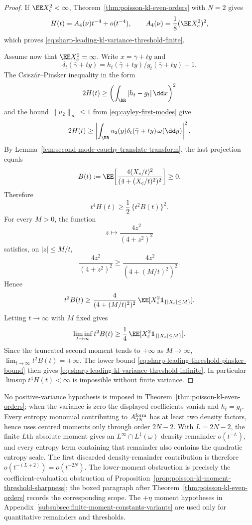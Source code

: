 \begin{proof}
If \(\EE X_c^2<\infty\), Theorem~\ref{thm:poisson-kl-even-orders} with
\(N=2\) gives
\[
H(t)=A_4(\nu)t^{-4}+o(t^{-4}),
\qquad
A_4(\nu)=\frac18(\EE X_c^2)^2,
\]
which proves \eqref{eq:sharp-leading-kl-variance-threshold-finite}.

Assume now that \(\EE X_c^2=\infty\).  Write \(x=\bar{\gamma}+ty\) and
\[
\delta_t(\bar{\gamma}+ty)=h_t(\bar{\gamma}+ty)/g_t(\bar{\gamma}+ty)-1 .
\]
The Csisz{\'a}r--Pinsker inequality
\cite{Pinsker1964,Csiszar1967,BolleyVillani2005} in the form
\[
2H(t)\ge \left(\int_{\RR}|h_t-g_t|\,\dd x\right)^2
\]
and the bound
\(\|u_2\|_\infty\le1\) from \eqref{eq:cayley-first-modes} give
\[
2H(t)\ge
\left|
\int_{\RR}u_2(y)\delta_t(\bar{\gamma}+ty)\,\omega(\dd y)
\right|^2 .
\]
By Lemma~\ref{lem:second-mode-cauchy-translate-transform}, the last
projection equals
\[
B(t):=\EE\!\left[\frac{4(X_c/t)^2}{(4+(X_c/t)^2)^2}\right]\ge0.
\]
Therefore
\begin{equation}\label{eq:sharp-leading-threshold-pinsker-bound}
t^4H(t)\ge\frac12\,\{t^2B(t)\}^2 .
\end{equation}
For every \(M>0\), the function
\[
z\longmapsto \frac{4z^2}{(4+z^2)^2}
\]
satisfies, on \(|z|\le M/t\),
\[
\frac{4z^2}{(4+z^2)^2}
\ge
\frac{4z^2}{(4+(M/t)^2)^2}.
\]
Hence
\[
t^2B(t)
\ge
\frac{4}{(4+(M/t)^2)^2}\,
\EE[X_c^2\mathbf1_{\{|X_c|\le M\}}].
\]
Letting \(t\to\infty\) with \(M\) fixed gives
\[
\liminf_{t\to\infty}t^2B(t)
\ge
\frac14\,\EE[X_c^2\mathbf1_{\{|X_c|\le M\}}].
\]
Since the truncated second moment tends to \(+\infty\) as \(M\to\infty\),
\(\lim_{t\to\infty}t^2B(t)=+\infty\).  The lower bound
\eqref{eq:sharp-leading-threshold-pinsker-bound} then gives
\eqref{eq:sharp-leading-kl-variance-threshold-infinite}.  In particular
\(\limsup t^4H(t)<\infty\) is impossible without finite variance.
\end{proof}

\begin{remark}
No positive-variance hypothesis is imposed in
Theorem~\ref{thm:poisson-kl-even-orders}; when the variance is zero the
displayed coefficients vanish and \(h_t=g_t\).
Every entropy monomial contributing to \(A_{2N}^{\rm form}\) has at least two
density factors, hence
uses centred moments only through order \(2N-2\).  With \(L=2N-2\), the finite
\(L\)th absolute moment gives an \(L^\infty\cap L^1(\omega)\) density
remainder \(o(t^{-L})\), and every entropy term containing that remainder also
contains the quadratic entropy scale.  The first discarded
density-remainder contribution is therefore \(o(t^{-(L+2)})=o(t^{-2N})\).
The lower-moment obstruction is precisely the coefficient-evaluation
obstruction of Proposition~\ref{prop:poisson-kl-moment-threshold-sharpness};
the boxed paragraph after Theorem~\ref{thm:poisson-kl-even-orders} records
the corresponding scope.  The \(+\eta\) moment
hypotheses in Appendix~\ref{subsubsec:finite-moment-constants-variants} are
used only for quantitative remainders and thresholds.
\end{remark}
